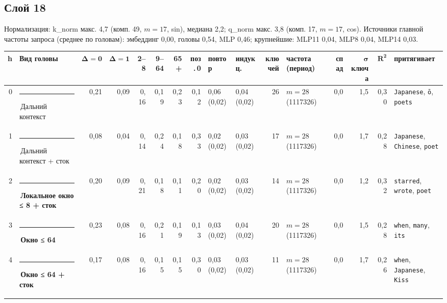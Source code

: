 \documentclass[10pt]{article}
\begin{document}
\noindent\begin{minipage}{\linewidth}
\subsection*{Слой 18}
{\small\color{ink2} Нормализация: k\_norm макс. 4,7 (комп. 49, $m{=}17$, sin), медиана 2,2; q\_norm макс. 3,8 (комп. 17, $m{=}17$, cos). Источники главной частоты запроса (среднее по головам): эмбеддинг 0,00, головы 0,54, MLP 0,46; крупнейшие: MLP11 0,04, MLP8 0,04, MLP14 0,03.}
\begin{center}{\footnotesize\begin{tabular}{|r|l|r|r|r|r|r|r|l|l|r|l|r|r|r|l|}
\hline
\rowcolor{head}\textbf{h} & \textbf{Вид головы} & $\boldsymbol{\Delta{=}0}$ & $\boldsymbol{\Delta{=}1}$ & \textbf{2–8} & \textbf{9–64} & \textbf{65+} & \textbf{поз.\,0} & \textbf{повтор} & \textbf{индукц.} & \textbf{ключей} & \textbf{частота (период)} & \textbf{спад} & $\boldsymbol{\sigma}$ \textbf{ключа} & $\boldsymbol{R^2}$ & \textbf{притягивает} \\ \hline
0 & \textcolor[HTML]{C3C2B7}{\rule{0.62em}{0.62em}}\,Дальний контекст & 0,21 & 0,09 & 0,16 & 0,19 & 0,23 & 0,12 & 0,06 (0,02) & 0,04 (0,02) & 26 & $m{=}28$ (1117326) & 0,0 & 1,5 & 0,30 & \texttt{\textvisiblespace{}Japanese}, \texttt{ō}, \texttt{\textvisiblespace{}poets} \\ \hline
1 & \textcolor[HTML]{C3C2B7}{\rule{0.62em}{0.62em}}\,Дальний контекст + сток & 0,08 & 0,04 & 0,14 & 0,24 & 0,18 & 0,33 & 0,02 (0,02) & 0,03 (0,02) & 17 & $m{=}28$ (1117326) & 0,0 & 1,7 & 0,28 & \texttt{\textvisiblespace{}Japanese}, \texttt{\textvisiblespace{}Chinese}, \texttt{\textvisiblespace{}poet} \\ \hline
2 & \textcolor[HTML]{1BAF7A}{\rule{0.62em}{0.62em}}\,\textbf{Локальное окно ≤ 8 + сток} & 0,20 & 0,09 & 0,21 & 0,18 & 0,11 & 0,20 & 0,02 (0,02) & 0,03 (0,02) & 14 & $m{=}28$ (1117326) & 0,0 & 1,2 & 0,32 & \texttt{\textvisiblespace{}starred}, \texttt{\textvisiblespace{}wrote}, \texttt{\textvisiblespace{}poet} \\ \hline
3 & \textcolor[HTML]{EDA100}{\rule{0.62em}{0.62em}}\,\textbf{Окно ≤ 64} & 0,23 & 0,08 & 0,16 & 0,21 & 0,19 & 0,13 & 0,03 (0,02) & 0,04 (0,02) & 20 & $m{=}28$ (1117326) & 0,0 & 1,5 & 0,28 & \texttt{\textvisiblespace{}when}, \texttt{\textvisiblespace{}many}, \texttt{\textvisiblespace{}its} \\ \hline
4 & \textcolor[HTML]{EDA100}{\rule{0.62em}{0.62em}}\,\textbf{Окно ≤ 64 + сток} & 0,17 & 0,08 & 0,16 & 0,15 & 0,15 & 0,30 & 0,03 (0,02) & 0,03 (0,02) & 11 & $m{=}28$ (1117326) & 0,0 & 1,7 & 0,26 & \texttt{\textvisiblespace{}when}, \texttt{\textvisiblespace{}Japanese}, \texttt{\textvisiblespace{}Kiss} \\ \hline

\end{tabular}}
\end{center}
\end{minipage}
\end{document}
